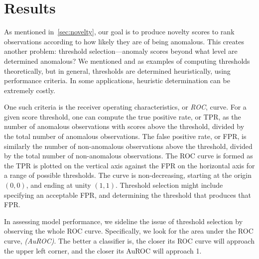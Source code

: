\section{Results\label{sec:results}}
As mentioned in~\ref{sec:novelty}, our goal is 
    to produce novelty scores to rank observations according to how likely 
    they are of being anomalous.  This creates another problem: threshold 
    selection---anomaly scores beyond what level are determined anomalous?  We 
    mentioned \cite{clifton2011} and \cite{gu2021} as examples of computing 
    thresholds theoretically, but in general, thresholds are determined 
    heuristically, using performance criteria.  In some applications, 
    heuristic determination can be extremely costly.

One such criteria is the receiver operating characteristics, or \emph{ROC}, 
    curve.  For  a given score threshold, one can compute the true positive 
    rate, or TPR, as the number of anomalous observations with scores above the 
    threshold, divided by the total number of anomalous observations.  The 
    false positive rate, or FPR, is similarly the number of non-anomalous 
    observations above the threshold, divided by the total number of 
    non-anomalous observations.  The ROC curve is formed as the TPR is plotted 
    on the vertical axis against the FPR on the horizontal axis for a range of 
    possible thresholds.  The curve is non-decreasing, starting at the origin 
    $(0,0)$, and ending at unity $(1,1)$.  Threshold selection might include 
    specifying an acceptable FPR, and determining the threshold that produces 
    that FPR.

In assessing model performance, we sideline the issue of threshold selection by 
    observing the whole ROC curve.  Specifically, we look for the area under 
    the ROC curve, \emph{(AuROC)}.  The better a classifier is, the closer its 
    ROC curve will approach the upper left corner, and the closer its AuROC will 
    approach 1.

